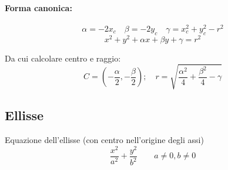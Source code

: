 \paragraph{Forma canonica:}
\[\alpha = -2x_c \quad \beta = -2y_c \quad \gamma = x_c^2 + y_c^2 - r^2\]
\[x^2+y^2+\alpha x+ \beta y +\gamma =r^2\]

Da cui calcolare centro e raggio:
\[C=\left(-\frac{\alpha}{2}, -\frac{\beta}{2}\right); \quad r=\sqrt{\frac{\alpha^2}{4}+\frac{\beta^2}{4}-\gamma}\]

\subsection{Ellisse}
Equazione dell'ellisse (con centro nell'origine degli assi)
\[\frac{x^2}{a^2}+\frac{y^2}{b^2} \qquad a\neq 0 , b\neq 0\]
